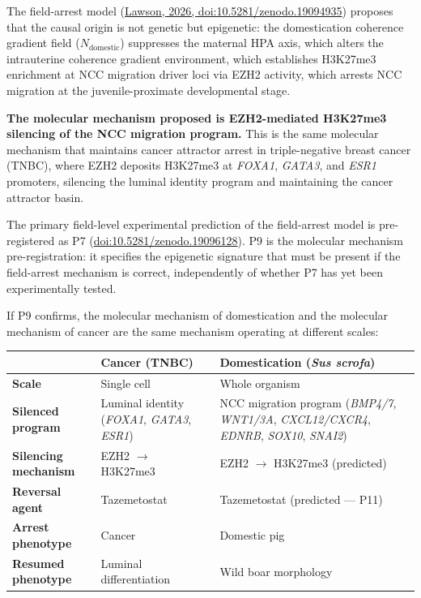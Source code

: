 \documentclass[10pt, a4paper]{article}
\begin{document}
The field-arrest model
(\href{https://doi.org/10.5281/zenodo.19094935}
{Lawson, 2026, doi:10.5281/zenodo.19094935})
proposes that the causal origin is not genetic
but epigenetic: the domestication coherence
gradient field ($N_{\text{domestic}}$) suppresses
the maternal HPA axis, which alters the
intrauterine coherence gradient environment,
which establishes H3K27me3 enrichment at NCC
migration driver loci via EZH2 activity, which
arrests NCC migration at the juvenile-proximate
developmental stage.

\textbf{The molecular mechanism proposed is
EZH2-mediated H3K27me3 silencing of the NCC
migration program.} This is the same molecular
mechanism that maintains cancer attractor arrest
in triple-negative breast cancer (TNBC), where
EZH2 deposits H3K27me3 at \textit{FOXA1},
\textit{GATA3}, and \textit{ESR1} promoters,
silencing the luminal identity program and
maintaining the cancer attractor basin.

The primary field-level experimental prediction
of the field-arrest model is pre-registered
as P7
(\href{https://doi.org/10.5281/zenodo.19096128}
{doi:10.5281/zenodo.19096128}).
P9 is the molecular mechanism pre-registration:
it specifies the epigenetic signature that
must be present if the field-arrest mechanism
is correct, independently of whether P7
has yet been experimentally tested.

If P9 confirms, the molecular mechanism of
domestication and the molecular mechanism of
cancer are the same mechanism operating at
different scales:

\begin{center}
\small
\begin{tabular}{p{3.2cm}p{5.0cm}p{5.0cm}}
\toprule
& \textbf{Cancer (TNBC)} &
  \textbf{Domestication (\textit{Sus scrofa})} \\
\midrule
\textbf{Scale} &
  Single cell &
  Whole organism \\[0.2em]
\textbf{Silenced program} &
  Luminal identity
  (\textit{FOXA1}, \textit{GATA3},
  \textit{ESR1}) &
  NCC migration program
  (\textit{BMP4/7}, \textit{WNT1/3A},
  \textit{CXCL12/CXCR4}, \textit{EDNRB},
  \textit{SOX10}, \textit{SNAI2}) \\[0.2em]
\textbf{Silencing mechanism} &
  EZH2 $\rightarrow$ H3K27me3 &
  EZH2 $\rightarrow$ H3K27me3
  (predicted) \\[0.2em]
\textbf{Reversal agent} &
  Tazemetostat &
  Tazemetostat (predicted --- P11) \\[0.2em]
\textbf{Arrest phenotype} &
  Cancer &
  Domestic pig \\[0.2em]
\textbf{Resumed phenotype} &
  Luminal differentiation &
  Wild boar morphology \\
\bottomrule
\end{tabular}
\end{center}
\end{document}
